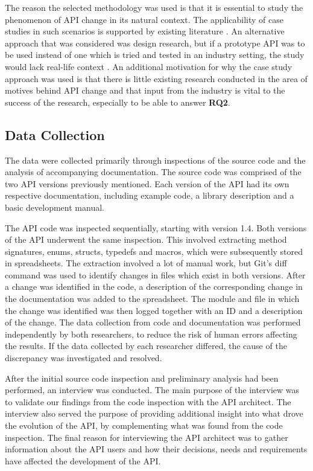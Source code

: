 \documentclass{sig-alternate}
\begin{document}
The reason the selected methodology was used is that it is essential to study the phenomenon of API change in its natural context. The applicability of case studies in such scenarios is supported by existing literature \cite{benbasat1987case} \cite{runeson2009guidelines} \cite{yin2013case} \cite{robson2002real}. An alternative approach that was considered was design research, but if a prototype API was to be used instead of one which is tried and tested in an industry setting, the study would lack real-life context \cite{runeson2009guidelines}. An additional motivation for why the case study approach was used is that there is little existing research conducted in the area of motives behind API change and that input from the industry is vital to the success of the research, especially to be able to answer \textbf{RQ2}. 


\subsection{Data Collection} \label{data_collection}  %
The data were collected primarily through inspections of the source code and the analysis of accompanying documentation. The source code was comprised of the two API versions previously mentioned. Each version of the API had its own respective documentation, including example code, a library description and a basic development manual. 

The API code was inspected sequentially, starting with version 1.4. Both versions of the API underwent the same inspection. This involved extracting method signatures, enums, structs, typedefs and macros, which were subsequently stored in spreadsheets. The extraction involved a lot of manual work, but Git's \cite{git} diff command was used to identify changes in files which exist in both versions. After a change was identified in the code, a description of the corresponding change in the documentation was added to the spreadsheet. The module and file in which the change was identified was then logged together with an ID and a description of the change. The data collection from code and documentation was performed independently by both researchers, to reduce the risk of human errors affecting the results. If the data collected by each researcher differed, the cause of the discrepancy was investigated and resolved. 

After the initial source code inspection and preliminary analysis had been performed, an interview was conducted. The main purpose of the interview was to validate our findings from the code inspection with the API architect. The interview also served the purpose of providing additional insight into what drove the evolution of the API, by complementing what was found from the code inspection. The final reason for interviewing the API architect was to gather information about the API users and how their decisions, needs and requirements have affected the development of the API. 
\end{document}

